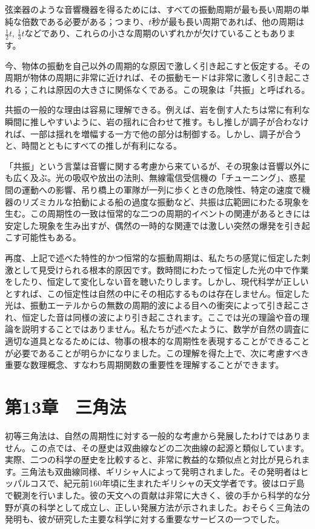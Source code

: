 \documentclass[a4paper,11pt,openany]{ltjsbook}
\begin{document}
弦楽器のような音響機器を得るためには、すべての振動周期が最も長い周期の単純な倍数である必要がある；つまり、$t$秒が最も長い周期であれば、他の周期は$\frac{1}{2}t$, $\frac{1}{3}t$などであり、これらの小さな周期のいずれかが欠けていることもあります。

今、物体の振動を自己以外の周期的な原因で激しく引き起こすと仮定する。その周期が物体の周期に非常に近ければ、その振動モードは非常に激しく引き起こされる；これは原因の大きさに関係なくである。この現象は「共振」と呼ばれる。

共振の一般的な理由は容易に理解できる。例えば、岩を倒す人たちは常に有利な瞬間に推しやすいように、岩の揺れに合わせて推す。もし推しが調子が合わなければ、一部は揺れを増幅する一方で他の部分は制御する。しかし、調子が合うと、時間とともにすべての推しが有利になる。

「共振」という言葉は音響に関する考慮から来ているが、その現象は音響以外にも広く及ぶ。光の吸収や放出の法則、無線電信受信機の「チューニング」、惑星間の運動への影響、吊り橋上の軍隊が一列に歩くときの危険性、特定の速度で機器のリズミカルな拍動による船の過度な振動など、共振は広範囲にわたる現象を生む。この周期性の一致は恒常的な二つの周期的イベントの関連があるときには安定した現象を生み出すが、偶然の一時的な関連では激しい突然の爆発を引き起こす可能性もある。

再度、上記で述べた特性的かつ恒常的な振動周期は、私たちの感覚に恒定した刺激として見受けられる根本的原因です。数時間にわたって恒定した光の中で作業をしたり、恒定して変化しない音を聴いたりします。しかし、現代科学が正しいとすれば、この恒定性は自然の中にその相応するものは存在しません。恒定した光は、振動エーテルからの無数の周期的波による目への衝突によって引き起こされ、恒定した音は同様の波により引き起こされます。ここでは光の理論や音の理論を説明することではありません。私たちが述べたように、数学が自然の調査に適切な道具となるためには、物事の根本的な周期性を表現することができることが必要であることが明らかになりました。この理解を得た上で、次に考慮すべき重要な数理概念、すなわち周期関数の重要性を理解することができます。

\chapter{第13章　三角法}

初等三角法は、自然の周期性に対する一般的な考慮から発展したわけではありません。この点では、その歴史は双曲線などの二次曲線の起源と類似しています。実際、二つの科学の歴史を比較すると、非常に教益的な類似点と対比が見られます。三角法も双曲線同様、ギリシャ人によって発明されました。その発明者はヒッパルコスで、紀元前160年頃に生まれたギリシャの天文学者です。彼はロデ島で観測を行いました。彼の天文への貢献は非常に大きく、彼の手から科学的な分野が真の科学として成立し、正しい発展方法が示されました。おそらく三角法の発明も、彼が研究した主要な科学に対する重要なサービスの一つでした。
\end{document}
